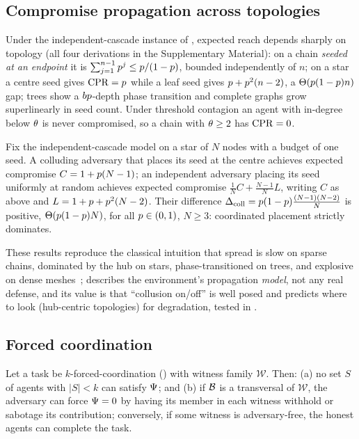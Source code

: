 \subsection{Compromise propagation across topologies}
\label{sec:theory-prop}
Under the independent-cascade instance of , expected reach depends sharply
on topology (all four derivations in the Supplementary Material): on a chain
\emph{seeded at an endpoint} it is $\sum_{j=1}^{n-1}p^{j}\le p/(1-p)$,
bounded independently of $n$; on a star a centre seed gives $\mathrm{CPR}=p$ while a leaf seed
gives $p+p^{2}(n-2)$, a $\Theta(p(1-p)n)$ gap; trees show a
$bp$-depth phase transition and complete graphs grow superlinearly in seed count.
Under threshold contagion an agent with in-degree below $\theta$ is never compromised, so
a chain with $\theta\ge2$ has $\mathrm{CPR}=0$.

\begin{theorem}
\label{thm:collusion}
Fix the independent-cascade model on a star of $N$ nodes with a budget of one seed. A
colluding adversary that places its seed at the centre achieves expected compromise
$C=1+p(N-1)$; an independent adversary placing its seed uniformly at random achieves
expected compromise $\tfrac1N C+\tfrac{N-1}{N}L$, writing $C$ as above and
$L=1+p+p^{2}(N-2)$. Their difference
$\Delta_{\mathrm{coll}}=p(1-p)\tfrac{(N-1)(N-2)}{N}$ is positive,
$\Theta(p(1-p)N)$, for all $p\in(0,1)$, $N\ge3$: coordinated placement
strictly dominates.
\end{theorem}

These results reproduce the classical intuition that spread is slow on sparse chains,
dominated by the hub on stars, phase-transitioned on trees, and explosive on dense
meshes~\cite{granovetter1978threshold,watts2002simple,kempe2003maximizing,chalupa1979bootstrap};
 describes the environment's propagation \emph{model}, not any real
defense, and its value is that ``collusion on/off'' is well posed and predicts where to
look (hub-centric topologies) for degradation, tested in .

\subsection{Forced coordination}
\label{sec:theory-forced}
\begin{proposition}
\label{prop:forced}
Let a task be $k$-forced-coordination () with witness family
$\mathcal{W}$. Then: (a) no set $S$ of agents with $|S|<k$ can satisfy $\Psi$; and
(b) if $\mathcal{B}$ is a transversal of $\mathcal{W}$, the adversary can force $\Psi=0$
by having its member in each witness withhold or sabotage its contribution; conversely,
if some witness is adversary-free, the honest agents can complete the task.
\end{proposition}

